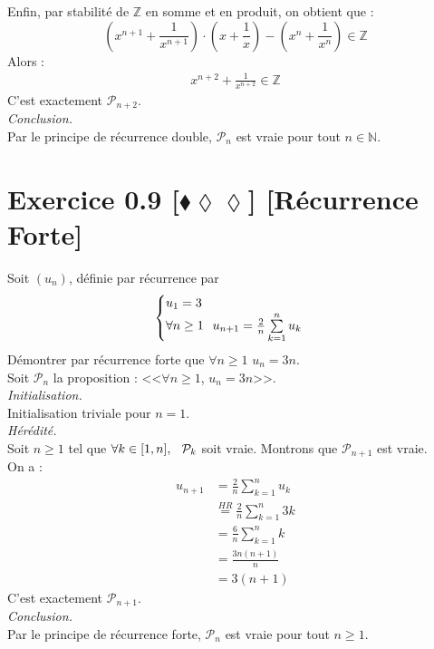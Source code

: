 \documentclass[10pt]{article}
\begin{document}
\begin{tcolorbox}[enhanced, width=6in, center, size=fbox, fontupper=\large, drop shadow southwest]
    Enfin, par stabilité de $\mathbb{Z}$ en somme et en produit, on obtient que :
    \begin{equation*}
        (x^{n+1}+\frac{1}{x^{n+1}})\cdot(x+\frac{1}{x})-(x^n+\frac{1}{x^n})\in\mathbb{Z}
    \end{equation*}
    Alors :
    \begin{align*}
        x^{n+2} + \frac{1}{x^{n+2}} \in \mathbb{Z}
    \end{align*}
    C'est exactement $\mathcal{P}_{n+2}$.\\
    \emph{Conclusion.}\\
    Par le principe de récurrence double, $\mathcal{P}_n$ est vraie pour tout $n\in\mathbb{N}$.
\end{tcolorbox}

\section*{Exercice 0.9 [$\blacklozenge\lozenge\lozenge$] [Récurrence Forte]}
\begin{tcolorbox}[enhanced, width=6in, center, size=fbox, fontupper=\large, drop shadow southwest]
    Soit $(u_n)$, définie par récurrence par
    \begin{equation*}
        \begin{cases}
            u_1 = 3\\
            \forall{n\geq1} \hspace{0.25cm} u_{n+1}= \frac{2}{n}\sum\limits^{n}_{k=1}{u_k}
        \end{cases}
    \end{equation*}
    Démontrer par récurrence forte que $\forall{n\geq1}$ $u_n=3n$.\\
    Soit $\mathcal{P}_n$ la proposition : <<$\forall{n\geq1}$, $u_n=3n$>>.\\
    \emph{Initialisation.}\\
    Initialisation triviale pour $n=1$.\\
    \emph{Hérédité.}\\
    Soit $n\geq1$ tel que $\forall k\in[1,n], \hspace{0.25cm} \mathcal{P}_k$ soit vraie. Montrons que $\mathcal{P}_{n+1}$ est vraie.\\
    On a :
    \begin{align*}
        u_{n+1} 
        &= \frac{2}{n}\sum^{n}_{k=1}{u_k}\\
        &\stackrel{HR}{=} \frac{2}{n}\sum^{n}_{k=1}{3k}\\
        &= \frac{6}{n}\sum^{n}_{k=1}{k}\\
        &= \frac{3n(n+1)}{n}\\
        &= 3(n+1)
    \end{align*}
    C'est exactement $\mathcal{P}_{n+1}$.\\
    \emph{Conclusion.}\\
    Par le principe de récurrence forte, $\mathcal{P}_n$ est vraie pour tout $n\geq1$.
\end{tcolorbox}
\end{document}

